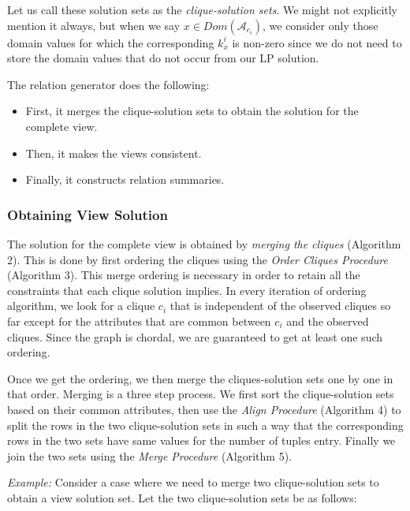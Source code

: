 \documentclass[]{article}
\begin{document}
\begin{multicols}{2}
			Let us call these solution sets as the {\em clique-solution sets}. 
			We might not explicitly mention it always, but when we say $x \in Dom(\mathcal{A}_{c_{i}})$, we consider only those domain values for which the corresponding $k_{x}^{i}$ is non-zero since we do not need to store the domain values that do not occur from our LP solution.
			
			The relation generator does the following:
			\begin{itemize}
				\item First, it merges the clique-solution sets to obtain the solution for the complete view.
				\item Then, it makes the views consistent.
				\item Finally, it constructs relation summaries.
			\end{itemize}
			
			
			\subsubsection{Obtaining View Solution}
			The solution for the complete view is obtained by {\em merging the cliques} (Algorithm 2). 
			This is done by first ordering the cliques using the {\em Order Cliques Procedure} (Algorithm 3). 
			This merge ordering is necessary in order to retain all the constraints that each clique solution implies. 
			In every iteration of ordering algorithm, we look for a clique $c_{i}$ that is independent of the observed cliques so far except for the attributes that are common between $c_{i}$ and the observed cliques. 
			Since the graph is chordal, we are guaranteed to get at least one such ordering. 
			
			Once we get the ordering, we then merge the cliques-solution sets one by one in that order. 
			Merging is a three step process. 
			We first sort the clique-solution sets based on their common attributes, then use the {\em Align Procedure} (Algorithm 4) to split the rows in the two clique-solution sets in such a way that the corresponding rows in the two sets have same values for the number of tuples entry. 
			Finally we join the two sets using the {\em Merge Procedure} (Algorithm 5).
			
			{\em Example:} Consider a case where we need to merge two clique-solution sets to obtain a view solution set. Let the two clique-solution sets be as follows: \\
			\end{multicols}
			
\end{document}
